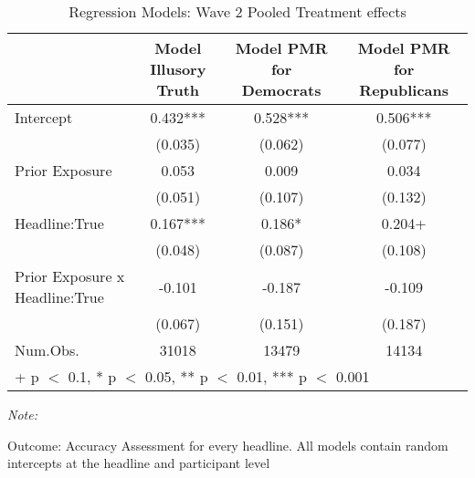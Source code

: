 \begin{table}

\caption{Regression Models: Wave 2 Pooled Treatment effects}
\centering
\begin{threeparttable}
\begin{tabular}[t]{lccc}
\toprule
  & Model Illusory Truth & Model PMR for Democrats & Model PMR for Republicans\\
\midrule
Intercept & 0.432*** & 0.528*** & 0.506***\\
 & (0.035) & (0.062) & (0.077)\\
Prior Exposure & 0.053 & 0.009 & 0.034\\
 & (0.051) & (0.107) & (0.132)\\
Headline:True & 0.167*** & 0.186* & 0.204+\\
 & (0.048) & (0.087) & (0.108)\\
Prior Exposure x Headline:True & -0.101 & -0.187 & -0.109\\
 & (0.067) & (0.151) & (0.187)\\
\midrule
Num.Obs. & 31018 & 13479 & 14134\\
\bottomrule
\multicolumn{4}{l}{\rule{0pt}{1em}+ p $<$ 0.1, * p $<$ 0.05, ** p $<$ 0.01, *** p $<$ 0.001}\\
\end{tabular}
\begin{tablenotes}
\item \textit{Note: } 
\item Outcome: Accuracy Assessment for every headline. All models contain random intercepts at the headline and participant level
\end{tablenotes}
\end{threeparttable}
\end{table}
